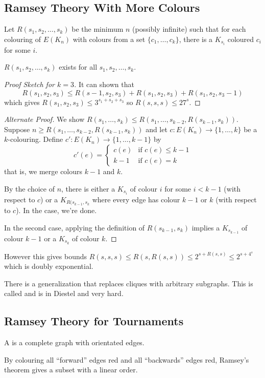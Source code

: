 \documentclass[main.tex]{subfiles}
\begin{document}
\subsection{Ramsey Theory With More Colours}
Let $R(s_1,s_2,\ldots,s_k)$ be the minimum $n$ (possibly infinite) such that
for each colouring of $E(K_n)$ with colours from a set $\{c_1,\ldots,c_k\}$,
there is a $K_{s_i}$ coloured $c_i$ for some $i$.

\begin{theorem}
  $R(s_1,s_2,\ldots,s_k)$ exists for all $s_1,s_2,\ldots,s_k$.
\end{theorem}
\begin{proof}[Proof Sketch for $k=3$]
  It can shown that
  \[
    R(s_1,s_2,s_3)\leq R(s-1,s_2,s_3) + R(s_1,s_2,s_3) + R(s_1,s_2,s_3-1)
  \]
  which gives $R(s_1,s_2,s_3)\leq 3^{s_1+s_2+s_3}$ so $R(s,s,s)\leq 27^s$.
\end{proof}
\begin{proof}[Alternate Proof]
  We show $R(s_1,\ldots,s_k)\leq R(s_1,\ldots, s_{k-2}, R(s_{k-1}, s_k))$.
  Suppose $n\geq R(s_1,\ldots,s_{k-2},R(s_{k-1},s_k))$ and let
  $c:E(K_n)\to\{1,\ldots,k\}$ be a $k$-colouring.
  Define $c':E(K_n)\to\{1,\ldots,k-1\}$ by
  \[
    c'(e) = \begin{cases}
      c(e) & \text{if }c(e)\leq k-1 \\
      k-1 & \text{if } c(e) = k
    \end{cases}
  \]
  that is, we merge colours $k-1$ and $k$.

  By the choice of $n$, there is either a $K_{s_i}$ of colour $i$ for some
  $i < k-1$ (with respect to $c$) or a $K_{R(s_{k-1}, s_k}$ where every edge
  has colour $k-1$ or $k$ (with respect to $c$).
  In the case, we're done.

  In the second case, applying the definition of $R(s_{k-1},s_k)$ implies a
  $K_{s_{k-1}}$ of colour $k-1$ or a $K_{s_k}$ of colour $k$.
\end{proof}
However this gives bounds
$R(s,s,s)\leq R(s,R(s,s))\leq 2^{s + R(s,s)}\leq 2^{s + 4^s}$
which is doubly exponential.

\begin{remark*}
  There is a generalization that replaces cliques with arbitrary subgraphs.
  This is called  and is in Diestel and very hard.
\end{remark*}

\subsection{Ramsey Theory for Tournaments}
\begin{definition*}
  A  is a complete graph with orientated edges.
\end{definition*}
By colouring all ``forward'' edges red and all ``backwards'' edges red,
Ramsey's theorem gives a subset with a linear order.
\end{document}
